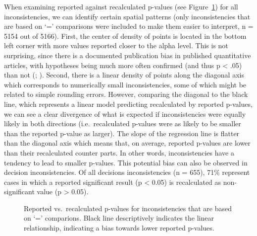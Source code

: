 \documentclass[
  doc,
  longtable,
  nolmodern,
  notxfonts,
  notimes,
  colorlinks=true,linkcolor=blue,citecolor=blue,urlcolor=blue]{apa7}
\begin{document}
When examining reported against recalculated p-values (see
Figure~\ref{fig-scatter}) for all inconsistencies, we can identify
certain spatial patterns (only inconsistencies that are based on `='
comparisons were included to make them easier to interpret, n = 5154 out
of 5166). First, the center of density of points is located in the
bottom left corner with more values reported closer to the alpha level.
This is not surprising, since there is a documented publication bias in
published quantitative articles, with hypotheses being much more often
confirmed (and thus p \textless{} .05) than not
(;
). Second, there
is a linear density of points along the diagonal axis which corresponds
to numerically small inconsistencies, some of which might be related to
simple rounding errors. However, comparing the diagonal to the black
line, which represents a linear model predicting recalculated by
reported p-values, we can see a clear divergence of what is expected if
inconsistencies were equally likely in both directions
(i.e.~recalculated p-values were as likely to be smaller than the
reported p-value as larger). The slope of the regression line is flatter
than the diagonal axis which means that, on average, reported p-values
are lower than their recalculated counter parts. In other words,
inconsistencies have a tendency to lead to smaller p-values. This
potential bias can also be observed in decision inconsistencies. Of all
decisions inconsistencies (n = 655), 71\% represent cases in which a
reported significant result (p \textless{} 0.05) is recalculated as
non-significant value (p \textgreater{} 0.05).

\begin{figure}

\caption{\label{fig-scatter}Reported vs.~recalculated p-values for
inconsistencies that are based on `=' comparions. Black line
descriptively indicates the linear relationship, indicating a bias
towards lower reported p-values.}


\end{figure}%
\end{document}
